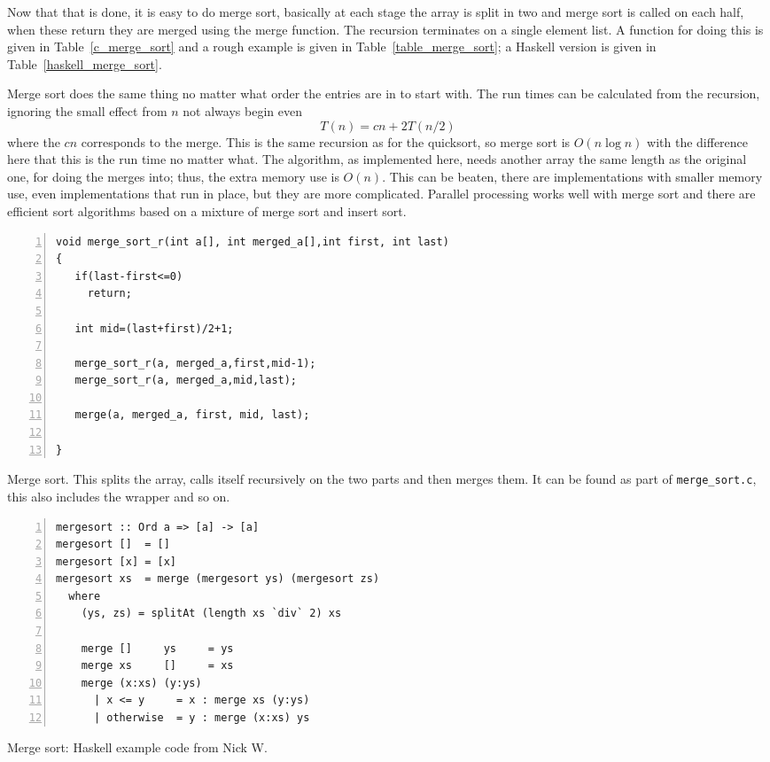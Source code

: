 \documentclass[11pt,a4paper]{scrartcl}
\begin{document}
Now that that is done, it is easy to do merge sort, basically at each
stage the array is split in two and merge sort is called on each half,
when these return they are merged using the merge function. The
recursion terminates on a single element list. A function for doing
this is given in Table~\ref{c_merge_sort} and a rough example is given
in Table~\ref{table_merge_sort}; a Haskell version is given in Table~\ref{haskell_merge_sort}.

Merge sort does the same thing no matter what order the entries are in
to start with. The run times can be calculated from the recursion,
ignoring the small effect from $n$ not always begin even
\begin{equation}
T(n)=cn+2T(n/2)
\end{equation}
where the $cn$ corresponds to the merge. This is the same recursion as
for the quicksort, so merge sort is $O(n\log{n})$ with the difference
here that this is the run time no matter what. The algorithm, as
implemented here, needs another array the same length as the original
one, for doing the merges into; thus, the extra memory use is
$O(n)$. This can be beaten, there are implementations with smaller
memory use, even implementations that run in place, but they are more
complicated. Parallel processing works well with merge sort and there
are efficient sort algorithms based on a mixture of merge sort and
insert sort.

\begin{table}
\begin{lstlisting}[numbers=left]
void merge_sort_r(int a[], int merged_a[],int first, int last)
{
   if(last-first<=0)
     return;

   int mid=(last+first)/2+1;

   merge_sort_r(a, merged_a,first,mid-1);
   merge_sort_r(a, merged_a,mid,last);

   merge(a, merged_a, first, mid, last);

}
\end{lstlisting}
\caption{Merge sort. This splits the array, calls itself recursively
  on the two parts and then merges them. It can be found as part of
  \texttt{merge\_sort.c}, this also includes the wrapper and so
  on. \label{c_merge_sort}}
\end{table}


\begin{table}
\begin{lstlisting}[numbers=left]
mergesort :: Ord a => [a] -> [a]
mergesort []  = []
mergesort [x] = [x]
mergesort xs  = merge (mergesort ys) (mergesort zs)
  where
    (ys, zs) = splitAt (length xs `div` 2) xs

    merge []     ys     = ys
    merge xs     []     = xs
    merge (x:xs) (y:ys)
      | x <= y     = x : merge xs (y:ys)
      | otherwise  = y : merge (x:xs) ys
\end{lstlisting}
\caption{Merge sort: Haskell example code from Nick W. \label{haskell_merge_sort}}
\end{table}
\end{document}

